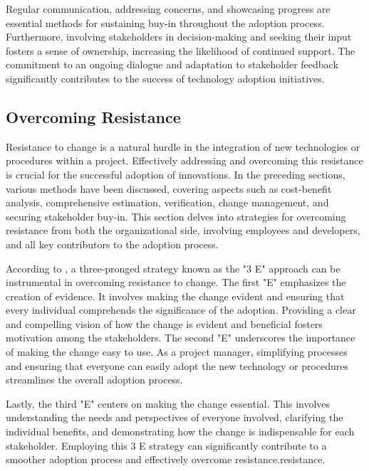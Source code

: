 \documentclass{article}
\begin{document}
\noindent Regular communication, addressing concerns, and showcasing progress are essential methods for sustaining buy-in throughout the adoption process. Furthermore, involving stakeholders in decision-making and seeking their input fosters a sense of ownership, increasing the likelihood of continued support. The commitment to an ongoing dialogue and adaptation to stakeholder feedback significantly contributes to the success of technology adoption initiatives.



\subsection{Overcoming Resistance}
Resistance to change is a natural hurdle in the integration of new technologies or procedures within a project. Effectively addressing and overcoming this resistance is crucial for the successful adoption of innovations. In the preceding sections, various methods have been discussed, covering aspects such as cost-benefit analysis, comprehensive estimation, verification, change management, and securing stakeholder buy-in. This section delves into strategies for overcoming resistance from both the organizational side, involving employees and developers, and all key contributors to the adoption process.\newline

\noindent According to \cite{reference9}, a three-pronged strategy known as the "3 E" approach can be instrumental in overcoming resistance to change. The first "E" emphasizes the creation of evidence. It involves making the change evident and ensuring that every individual comprehends the significance of the adoption. Providing a clear and compelling vision of how the change is evident and beneficial fosters motivation among the stakeholders. The second "E" underscores the importance of making the change easy to use. As a project manager, simplifying processes and ensuring that everyone can easily adopt the new technology or procedures streamlines the overall adoption process. \newline

\noindent Lastly, the third "E" centers on making the change essential. This involves understanding the needs and perspectives of everyone involved, clarifying the individual benefits, and demonstrating how the change is indispensable for each stakeholder. Employing this 3 E strategy can significantly contribute to a smoother adoption process and effectively overcome resistance.resistance.
\end{document}
